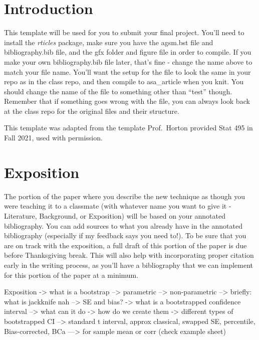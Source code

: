 \documentclass[12pt]{article}
\begin{document}
\hypertarget{introduction}{%
\section{Introduction}\label{introduction}}

This template will be used for you to submit your final project. You'll
need to install the \emph{rticles} package, make sure you have the
agsm.bst file and bibliography.bib file, and the gfx folder and figure
file in order to compile. If you make your own bibliography.bib file
later, that's fine - change the name above to match your file name.
You'll want the setup for the file to look the same in your repo as in
the class repo, and then compile to asa\_article when you knit. You
should change the name of the file to something other than ``test''
though. Remember that if something goes wrong with the file, you can
always look back at the class repo for the original files and their
structure.

This template was adapted from the template Prof.~Horton provided Stat
495 in Fall 2021, used with permission.

\hypertarget{exposition}{%
\section{Exposition}\label{exposition}}

The portion of the paper where you describe the new technique as though
you were teaching it to a classmate (with whatever name you want to give
it - Literature, Background, or Exposition) will be based on your
annotated bibliography. You can add sources to what you already have in
the annotated bibliography (especially if my feedback says you need
to!). To be sure that you are on track with the exposition, a full draft
of this portion of the paper is due before Thanksgiving break. This will
also help with incorporating proper citation early in the writing
process, as you'll have a bibliography that we can implement for this
portion of the paper at a minimum.

Exposition -\textgreater{} what is a bootstrap --\textgreater{}
parametric --\textgreater{} non-parametric --\textgreater{} briefly:
what is jackknife nah --\textgreater{} SE and bias? -\textgreater{} what
is a bootstrapped confidence interval --\textgreater{} what can it do
-\textgreater{} how do we create them -\textgreater{} different types of
bootstrapped CI --\textgreater{} standard t interval, approx classical,
swapped SE, percentile, Bias-corrected, BCa ---\textgreater{} for sample
mean or corr (check example sheet)
\end{document}
